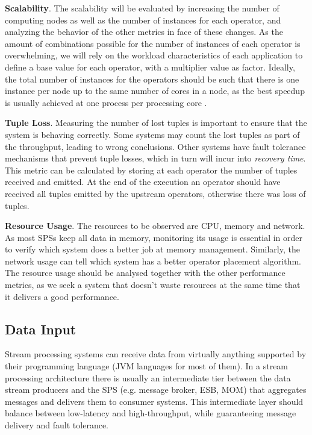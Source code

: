 \documentclass[ppgc,diss,english]{iiufrgs}
\begin{document}
\textbf{Scalability}. The scalability will be evaluated by increasing the number of computing nodes as well as the number of instances for each operator, and analyzing the behavior of the other metrics in face of these changes. As the amount of combinations possible for the number of instances of each operator is overwhelming, we will rely on the workload characteristics of each application to define a base value for each operator, with a multiplier value as factor. Ideally, the total number of instances for the operators should be such that there is one instance per node up to the same number of cores in a node, as the best speedup is usually achieved at one process per processing core \cite{ravi2009performance, chai2007understanding}.

\textbf{Tuple Loss}. Measuring the number of lost tuples is important to ensure that the system is behaving correctly. Some systems may count the lost tuples as part of the throughput, leading to wrong conclusions. Other systems have fault tolerance mechanisms that prevent tuple losses, which in turn will incur into \emph{recovery time}. This metric can be calculated by storing at each operator the number of tuples received and emitted. At the end of the execution an operator should have received all tuples emitted by the upstream operators, otherwise there was loss of tuples.

\textbf{Resource Usage}. The resources to be observed are CPU, memory and network. As most SPSs keep all data in memory, monitoring its usage is essential in order to verify which system does a better job at memory management. Similarly, the network usage can tell which system has a better operator placement algorithm. The resource usage should be analysed together with the other performance metrics, as we seek a system that doesn't waste resources at the same time that it delivers a good performance.

\subsection{Data Input}

Stream processing systems can receive data from virtually anything supported by their programming language (JVM languages for most of them). In a stream processing architecture there is usually \cite{chardonnens2013big, lim2013execution, wang2013cluster, sawant2013big} an intermediate tier between the data stream producers and the SPS (e.g. message broker, ESB, MOM) that aggregates messages and delivers them to consumer systems. This intermediate layer should balance between low-latency and high-throughput, while guaranteeing message delivery and fault tolerance.
\end{document}
